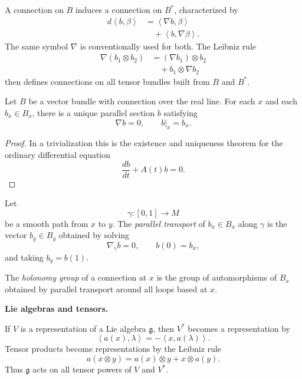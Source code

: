 A connection on $B$ induces a connection on
$B^*$, characterized by
$$
\begin{aligned}
d\left\langle{}b,\beta\right\rangle{}
&=\left\langle{}\nabla b,
\beta\right\rangle{}\\
&\quad+
\left\langle{}b,
\nabla\beta\right\rangle{}.
\end{aligned}
$$
The same symbol $\nabla$ is conventionally
used for both. The Leibniz rule
$$
\begin{aligned}
\nabla(b_1\otimes b_2)
&=(\nabla b_1)\otimes b_2\\
&\quad+b_1\otimes\nabla b_2
\end{aligned}
$$
then defines connections on all tensor
bundles built from $B$ and $B^*$.

\begin{theorem}
\label{theorem-parallel-section-line}
Let $B$ be a vector bundle with connection
over the real line. For each $x$ and each
$b_x\in B_x$, there is a unique parallel
section $b$ satisfying
$$
\nabla b=0,
\qquad
b|_x=b_x.
$$
\end{theorem}

\begin{proof}
In a trivialization this is the existence
and uniqueness theorem for the ordinary
differential equation
$$
\frac{db}{dt}+A(t)b=0.
$$
\end{proof}

\begin{definition}
\label{definition-parallel-transport}
Let
$$
\gamma:[0,1]\longrightarrow M
$$
be a smooth path from $x$ to $y$. The
{\it parallel transport} of $b_x\in B_x$
along $\gamma$ is the vector $b_y\in B_y$
obtained by solving
$$
\nabla_{\dot\gamma}b=0,
\qquad
b(0)=b_x,
$$
and taking $b_y=b(1)$.
\end{definition}

\begin{definition}
\label{definition-holonomy-group}
The {\it holonomy group} of a connection at
$x$ is the group of automorphisms of $B_x$
obtained by parallel transport around all
loops based at $x$.
\end{definition}

\medskip\noindent
{\bf Lie algebras and tensors.}

If $V$ is a representation of a Lie algebra
$\mathfrak{g}$, then $V^*$ becomes a
representation by
$$
\left\langle{}a(x),\lambda
\right\rangle{}
=-
\left\langle{}x,a(\lambda)
\right\rangle{}.
$$
Tensor products become representations by
the Leibniz rule
$$
a(x\otimes y)
=a(x)\otimes y+x\otimes a(y).
$$
Thus $\mathfrak{g}$ acts on all tensor
powers of $V$ and $V^*$.

